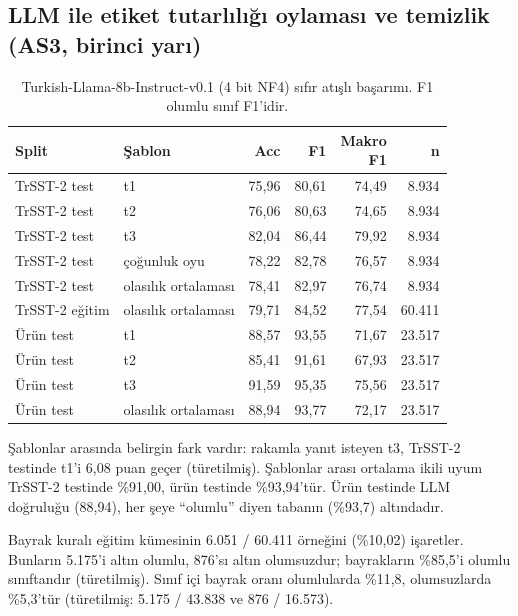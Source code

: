 \documentclass[11pt]{article}
\begin{document}
\subsection{LLM ile etiket tutarlılığı oylaması ve temizlik (AS3, birinci yarı)}

\begin{table}[!htbp]
\centering
\small
\setlength{\tabcolsep}{4pt}
\begin{tabular}{llrrrr}
\toprule
Split & Şablon & Acc & F1 & \makecell[r]{Makro \\ F1} & n \\
\midrule
TrSST-2 test & t1 & \mbox{75,96} & \mbox{80,61} & \mbox{74,49} & \mbox{8.934} \\
TrSST-2 test & t2 & \mbox{76,06} & \mbox{80,63} & \mbox{74,65} & \mbox{8.934} \\
TrSST-2 test & t3 & \mbox{82,04} & \mbox{86,44} & \mbox{79,92} & \mbox{8.934} \\
TrSST-2 test & çoğunluk oyu & \mbox{78,22} & \mbox{82,78} & \mbox{76,57} & \mbox{8.934} \\
TrSST-2 test & olasılık ortalaması & \mbox{78,41} & \mbox{82,97} & \mbox{76,74} & \mbox{8.934} \\
TrSST-2 eğitim & olasılık ortalaması & \mbox{79,71} & \mbox{84,52} & \mbox{77,54} & \mbox{60.411} \\
Ürün test & t1 & \mbox{88,57} & \mbox{93,55} & \mbox{71,67} & \mbox{23.517} \\
Ürün test & t2 & \mbox{85,41} & \mbox{91,61} & \mbox{67,93} & \mbox{23.517} \\
Ürün test & t3 & \mbox{91,59} & \mbox{95,35} & \mbox{75,56} & \mbox{23.517} \\
Ürün test & olasılık ortalaması & \mbox{88,94} & \mbox{93,77} & \mbox{72,17} & \mbox{23.517} \\
\bottomrule
\end{tabular}
\caption{Turkish-Llama-8b-Instruct-v0.1 \citep{kesgin2024} (4 bit NF4) sıfır atışlı başarımı. F1 olumlu sınıf F1'idir.}
\label{tab:16}
\end{table}

Şablonlar arasında belirgin fark vardır: rakamla yanıt isteyen t3, TrSST-2 testinde t1'i 6,08 puan geçer (türetilmiş). Şablonlar arası ortalama ikili uyum TrSST-2 testinde \%91,00, ürün testinde \%93,94'tür. Ürün testinde LLM doğruluğu (88,94), her şeye ``olumlu'' diyen tabanın (\%93,7) altındadır.

Bayrak kuralı eğitim kümesinin 6.051 / 60.411 örneğini (\%10,02) işaretler. Bunların 5.175'i altın olumlu, 876'sı altın olumsuzdur; bayrakların \%85,5'i olumlu sınıftandır (türetilmiş). Sınıf içi bayrak oranı olumlularda \%11,8, olumsuzlarda \%5,3'tür (türetilmiş: 5.175 / 43.838 ve 876 / 16.573).
\end{document}
